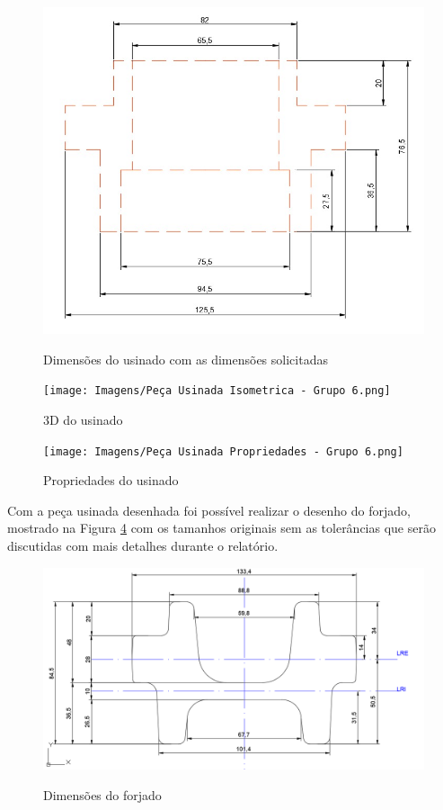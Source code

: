 \documentclass[deposito, acronym, symbols]{fei}
\begin{document}
\begin{figure}[!htp]
    \centering
    \caption{Dimensões do usinado com as dimensões solicitadas }
    \includegraphics[width=0.7\linewidth]{Imagens/cotas usinados certo.jpeg}
    \label{fig:peçausinada}
\end{figure}

\begin{figure}[!htp]
    \centering
    \caption{3D do usinado}
    \texttt{[image: Imagens/Peça Usinada Isometrica - Grupo 6.png]}
    \label{fig:peçausinada3d}
\end{figure}

\newpage

\begin{figure}[!htp]
    \centering
    \caption{Propriedades do usinado}
    \texttt{[image: Imagens/Peça Usinada Propriedades - Grupo 6.png]}
    \label{fig:peçausinadapro}
\end{figure}

\newpage

Com a peça usinada desenhada foi possível realizar o desenho do forjado, mostrado na Figura \ref{fig:peçaforjada} com os tamanhos originais sem as tolerâncias que serão discutidas com mais detalhes durante o relatório. 

\begin{figure}[!htp]
    \centering
    \caption{Dimensões do forjado}
    \includegraphics[width=0.8\linewidth]{Imagens/cotas forjado certo.png}
    \label{fig:peçaforjada}
\end{figure}
\end{document}
